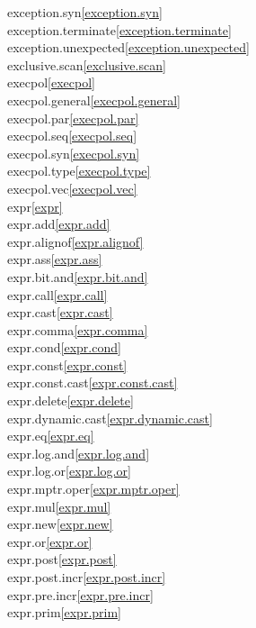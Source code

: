 \begin{multicols}{2}
exception.syn\quad\ref{exception.syn}\\
exception.terminate\quad\ref{exception.terminate}\\
exception.unexpected\quad\ref{exception.unexpected}\\
exclusive.scan\quad\ref{exclusive.scan}\\
execpol\quad\ref{execpol}\\
execpol.general\quad\ref{execpol.general}\\
execpol.par\quad\ref{execpol.par}\\
execpol.seq\quad\ref{execpol.seq}\\
execpol.syn\quad\ref{execpol.syn}\\
execpol.type\quad\ref{execpol.type}\\
execpol.vec\quad\ref{execpol.vec}\\
expr\quad\ref{expr}\\
expr.add\quad\ref{expr.add}\\
expr.alignof\quad\ref{expr.alignof}\\
expr.ass\quad\ref{expr.ass}\\
expr.bit.and\quad\ref{expr.bit.and}\\
expr.call\quad\ref{expr.call}\\
expr.cast\quad\ref{expr.cast}\\
expr.comma\quad\ref{expr.comma}\\
expr.cond\quad\ref{expr.cond}\\
expr.const\quad\ref{expr.const}\\
expr.const.cast\quad\ref{expr.const.cast}\\
expr.delete\quad\ref{expr.delete}\\
expr.dynamic.cast\quad\ref{expr.dynamic.cast}\\
expr.eq\quad\ref{expr.eq}\\
expr.log.and\quad\ref{expr.log.and}\\
expr.log.or\quad\ref{expr.log.or}\\
expr.mptr.oper\quad\ref{expr.mptr.oper}\\
expr.mul\quad\ref{expr.mul}\\
expr.new\quad\ref{expr.new}\\
expr.or\quad\ref{expr.or}\\
expr.post\quad\ref{expr.post}\\
expr.post.incr\quad\ref{expr.post.incr}\\
expr.pre.incr\quad\ref{expr.pre.incr}\\
expr.prim\quad\ref{expr.prim}\\

\end{multicols}
